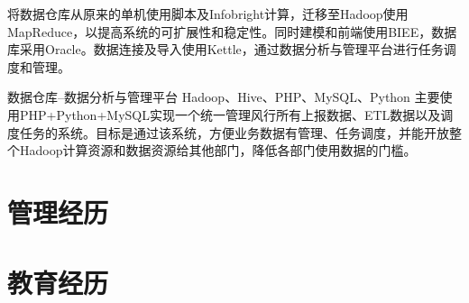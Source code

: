 \documentclass[11pt,a4paper]{moderncv}
\begin{document}
\vspace*{0.2\baselineskip}
{将数据仓库从原来的单机使用脚本及Infobright计算，迁移至Hadoop使用MapReduce，以提高系统的可扩展性和稳定性。同时建模和前端使用BIEE，数据库采用Oracle。数据连接及导入使用Kettle，通过数据分析与管理平台进行任务调度和管理。}

\vspace*{0.2\baselineskip}
{数据仓库--数据分析与管理平台}
{Hadoop、Hive、PHP、MySQL、Python}
{}{}
{主要使用PHP+Python+MySQL实现一个统一管理风行所有上报数据、ETL数据以及调度任务的系统。目标是通过该系统，方便业务数据有管理、任务调度，并能开放整个Hadoop计算资源和数据资源给其他部门，降低各部门使用数据的门槛。}

\section{管理经历}
\renewcommand{\baselinestretch}{1.2}
\renewcommand{\baselinestretch}{1.0}


\section{教育经历}
\end{document}

